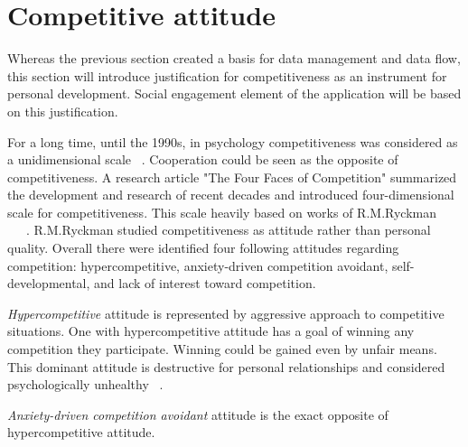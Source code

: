 
\section{Competitive attitude}\label{sec:competitive-attitude}



Whereas the previous section created a basis for data management and data flow,
this section will introduce justification for competitiveness as an instrument for personal development.
Social engagement element of the application will be based on this justification.

For a long time, until the 1990s, in psychology competitiveness was considered as a unidimensional scale ~\cite{the-four-faces-of-competetition}.
Cooperation could be seen as the opposite of competitiveness.
A research article "The Four Faces of Competition" summarized the development and research of recent decades and introduced four-dimensional scale for competitiveness.
This scale heavily based on works of R.M.Ryckman ~\cite{ryckman-pdca}~\cite{ryckman-hca}~\cite{ryckman-caa}.
R.M.Ryckman studied competitiveness as attitude rather than personal quality.
Overall there were identified four following attitudes regarding competition:
hypercompetitive, anxiety-driven competition avoidant, self-developmental,  and lack of interest toward competition.

\textit{Hypercompetitive} attitude is represented by aggressive approach to competitive situations.
One with hypercompetitive attitude has a goal of winning any competition they participate.
Winning could be gained even by unfair means.
This dominant attitude is destructive for personal relationships and considered psychologically unhealthy ~\cite{ryckman-hca}.

\textit{Anxiety-driven competition avoidant} attitude is the exact opposite of hypercompetitive attitude.
